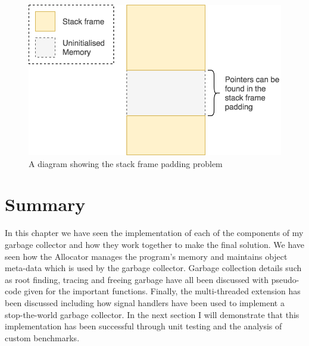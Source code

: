 \documentclass[../diss.tex]{subfiles}
\begin{document}
\begin{figure}
    \centering
    \includegraphics[max width=\linewidth]{figs/stackframepadding.png}
    \caption{A diagram showing the stack frame padding problem}
    \label{fig:stackframepadding}
\end{figure}

\section{Summary}

In this chapter we have seen the implementation of each of the components of my garbage collector and how they work together to make the final solution. We have seen how the Allocator manages the program's memory and maintains object meta-data which is used by the garbage collector. Garbage collection details such as root finding, tracing and freeing garbage have all been discussed with pseudo-code given for the important functions. Finally, the multi-threaded extension has been discussed including how signal handlers have been used to implement a stop-the-world garbage collector. In the next section I will demonstrate that this implementation has been successful through unit testing and the analysis of custom benchmarks.
\end{document}
